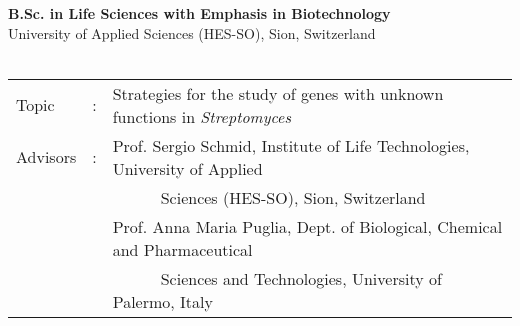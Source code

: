 \documentclass{CV}
\begin{document}

\vspace{-0.5em}
\textbf{B.Sc. in Life Sciences with Emphasis in Biotechnology} \hfill {}\\
University of Applied Sciences (HES-SO), Sion, Switzerland\\
~\\
\begin{tabular}{lcl}
    Topic&:& Strategies for the study of genes with unknown functions in \textit{Streptomyces}\\
    Advisors&:& Prof. Sergio Schmid, Institute of Life Technologies, University of Applied \\
    &&~~~~~~Sciences (HES-SO), Sion, Switzerland\\
    && Prof. Anna Maria Puglia, Dept. of Biological, Chemical and Pharmaceutical\\
    && ~~~~~~Sciences and Technologies, University of Palermo, Italy\\
\end{tabular}
~\\




\end{document}

